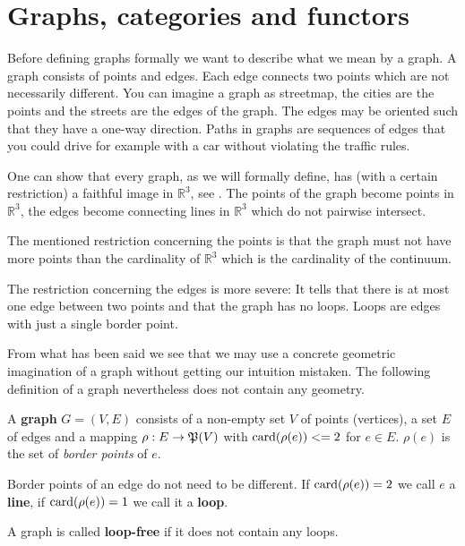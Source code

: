 \section{Graphs, categories and functors}

Before defining graphs formally we want to describe what we mean by a graph. A
graph consists of points and edges. Each edge connects two points which are not
necessarily different. You can imagine a graph as streetmap, the cities are the
points and the streets are the edges of the graph. The edges may be oriented
such that they have a one-way direction. Paths in graphs are sequences of edges
that you could drive for example with a car without violating the traffic rules.

One can show that every graph, as we will formally define, has (with a certain
restriction) a faithful image in $\mathbb{R}^3$, see \cite{Wagner}. The points
of the graph become points in $\mathbb{R}^3$, the edges become connecting lines
in $\mathbb{R}^3$ which do not pairwise intersect.

The mentioned restriction concerning the points is that the graph must not have
more points than the cardinality of $\mathbb{R}^3$ which is the cardinality of
the continuum.

The restriction concerning the edges is more severe: It tells that there is at
most one edge between two points and that the graph has no loops.
Loops are edges with just a single border point.

From what has been said we see that we may use a concrete geometric imagination
of a graph without getting our intuition mistaken. The following definition of a
graph nevertheless does not contain any geometry.

\begin{definition}
A {\bf graph} $G = (V, E)$ consists of a non-empty set $V$ of points
(vertices), a set $E$ of edges and a mapping $\rho: E \to \mathfrak{P}({V})$ with
$\mathrm{card}({\rho(e)}) <= 2$ for $e \in E$. $\rho(e)$ is the set of {\em border points}
of $e$.
\end{definition}

Border points of an edge do not need to be different. If $\mathrm{card}({\rho(e)}) = 2$ we
call $e$ a {\bf line}, if $\mathrm{card}({\rho(e)}) = 1$ we call it a {\bf loop}.

\begin{definition}
A graph is called {\bf loop-free} if it does not contain any loops.
\end{definition}

